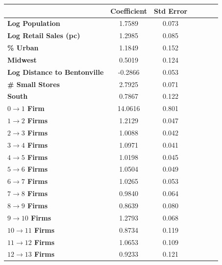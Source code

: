 \begin{center}
\begin{tabular}{lcccccc}
                                & \textbf{Coefficient} & \textbf{Std Error} \\
\midrule
\textbf{Log Population}               &       1.7589  &        0.073      \\
  \textbf{Log Retail Sales (pc)} &       1.2985  &        0.085      \\
\textbf{\% Urban}             &       1.1849  &        0.152      \\
\textbf{Midwest}                &       0.5019  &        0.124      \\
\textbf{Log Distance to Bentonville}      &      -0.2866  &        0.053      \\
\textbf{\# Small Stores}       &       2.7925  &        0.071      \\
\textbf{South}                  &       0.7867  &        0.122      \\
\textbf{$0\rightarrow 1$ Firm}                &      14.0616  &        0.801      \\
\textbf{$1\rightarrow 2$ Firms}                &       1.2129  &        0.047      \\
\textbf{$2\rightarrow 3$ Firms}                &       1.0088  &        0.042      \\
\textbf{$3\rightarrow 4$ Firms}                &       1.0971  &        0.041      \\
\textbf{$4\rightarrow 5$ Firms}                &       1.0198  &        0.045      \\
\textbf{$5\rightarrow 6$ Firms}                &       1.0504  &        0.049      \\
\textbf{$6\rightarrow 7$ Firms}                &       1.0265  &        0.053      \\
\textbf{$7\rightarrow 8$ Firms}                &       0.9840  &        0.064      \\
\textbf{$8\rightarrow 9$ Firms}                &       0.8639  &        0.080      \\
\textbf{$9\rightarrow 10$ Firms}               &       1.2793  &        0.068      \\
\textbf{$10\rightarrow 11$ Firms}              &       0.8734  &        0.119      \\
\textbf{$11\rightarrow 12$ Firms}              &       1.0653  &        0.109      \\
\textbf{$12\rightarrow 13$ Firms}              &       0.9233  &        0.121      \\
\bottomrule
\end{tabular}
\end{center}
